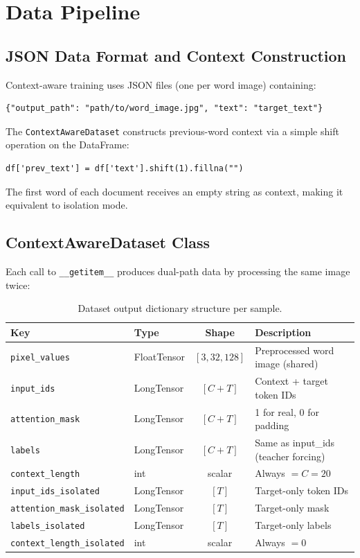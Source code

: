 \documentclass[11pt, a4paper]{report}
\begin{document}
\chapter{Data Pipeline}
\label{ch:data}

\section{JSON Data Format and Context Construction}
\label{sec:json-format}

Context-aware training uses JSON files (one per word image) containing:
\begin{lstlisting}[style=pythonstyle, frame=single, numbers=none]
{"output_path": "path/to/word_image.jpg", "text": "target_text"}
\end{lstlisting}

The \texttt{ContextAwareDataset} constructs previous-word context via a simple shift operation on the DataFrame:
\begin{lstlisting}[style=pythonstyle, frame=single, numbers=none]
df['prev_text'] = df['text'].shift(1).fillna("")
\end{lstlisting}
The first word of each document receives an empty string as context, making it equivalent to isolation mode.


\section{ContextAwareDataset Class}
\label{sec:context-dataset}

Each call to \texttt{\_\_getitem\_\_} produces dual-path data by processing the same image twice:

\begin{table}[h]
\centering
\caption{Dataset output dictionary structure per sample.}
\label{tab:dataset-output}
\begin{tabularx}{\textwidth}{llcX}
\toprule
\textbf{Key} & \textbf{Type} & \textbf{Shape} & \textbf{Description} \\
\midrule
\texttt{pixel\_values} & FloatTensor & $[3, 32, 128]$ & Preprocessed word image (shared) \\
\texttt{input\_ids} & LongTensor & $[C{+}T]$ & Context + target token IDs \\
\texttt{attention\_mask} & LongTensor & $[C{+}T]$ & 1 for real, 0 for padding \\
\texttt{labels} & LongTensor & $[C{+}T]$ & Same as input\_ids (teacher forcing) \\
\texttt{context\_length} & int & scalar & Always $= C = 20$ \\
\midrule
\texttt{input\_ids\_isolated} & LongTensor & $[T]$ & Target-only token IDs \\
\texttt{attention\_mask\_isolated} & LongTensor & $[T]$ & Target-only mask \\
\texttt{labels\_isolated} & LongTensor & $[T]$ & Target-only labels \\
\texttt{context\_length\_isolated} & int & scalar & Always $= 0$ \\
\bottomrule
\end{tabularx}
\end{table}
\end{document}
